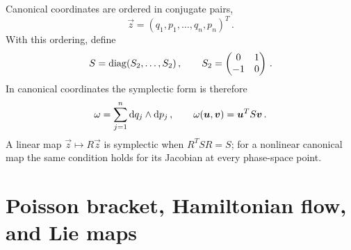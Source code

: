 Canonical coordinates are ordered in conjugate pairs,
\begin{equation}\label{eq:conv-coordinates}
    \vec z = (q_1,p_1,\ldots,q_n,p_n)^T\,.
\end{equation}
With this ordering, define
\begin{equation}\label{eq:conv-S}
    S = \operatorname{diag}(S_2,\ldots,S_2)\,,
    \qquad
    S_2 = \begin{pmatrix}
        0 & 1\\
        -1 & 0
    \end{pmatrix}\,.
\end{equation}
In canonical coordinates the symplectic form is therefore
\begin{equation}\label{eq:conv-symplectic-form}
    \omega = \sum_{j = 1}^n \text{d} q_j\wedge\text{d} p_j\,,
    \qquad
    \omega(\bm{u},\bm{v}) = \bm{u}^T S\bm{v}\,.
\end{equation}
A linear map $\vec z\mapsto R\vec z$ is symplectic when
$R^T S R = S$; for a nonlinear canonical map the same condition holds for its
Jacobian at every phase-space point.



\section{Poisson bracket, Hamiltonian flow, and Lie maps}

